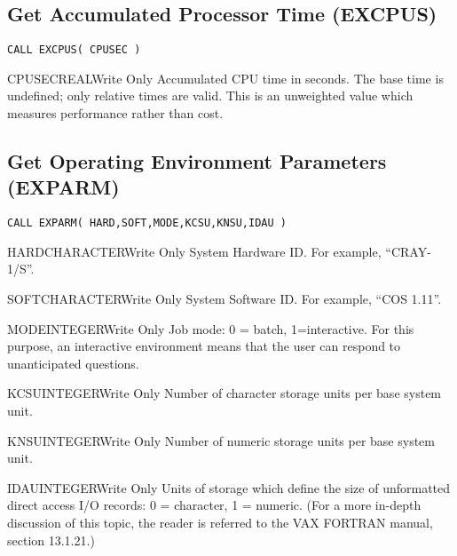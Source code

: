 \subsection{Get Accumulated Processor Time (EXCPUS)}

\verb+CALL EXCPUS( CPUSEC )+

\begin{argy}{CPUSEC}{REAL}{Write Only}
Accumulated CPU time in seconds.  The base time is undefined; only relative
times are valid.  This is an unweighted value which measures performance
rather than cost.
\end{argy}

\subsection{Get Operating Environment Parameters (EXPARM)}

\verb+CALL EXPARM( HARD,SOFT,MODE,KCSU,KNSU,IDAU )+

\begin{argy}{HARD}{CHARACTER}{Write Only}
System Hardware ID.  For example, ``CRAY-1/S''.
\end{argy}

\begin{argy}{SOFT}{CHARACTER}{Write Only}
System Software ID.  For example, ``COS 1.11''.
\end{argy}

\begin{argy}{MODE}{INTEGER}{Write Only}
Job mode: 0 = batch, 1=interactive.  For this purpose, an interactive
environment means that the user can respond to unanticipated questions.
\end{argy}

\begin{argy}{KCSU}{INTEGER}{Write Only}
Number of character storage units per base system unit.
\end{argy}

\begin{argy}{KNSU}{INTEGER}{Write Only}
Number of numeric storage units per base system unit.
\end{argy}

\begin{argy}{IDAU}{INTEGER}{Write Only}
Units of storage which define the size of unformatted direct access I/O
records: 0 = character, 1 = numeric.
(For a more in-depth discussion of this topic, the reader is
referred to the VAX FORTRAN manual,
section 13.1.21.)
\end{argy}

